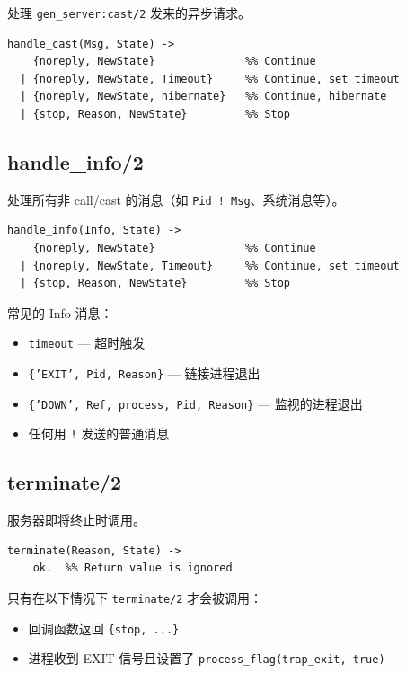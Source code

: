 \documentclass[a4paper,11pt]{article}
\begin{document}
处理 \texttt{gen\_server:cast/2} 发来的异步请求。

\begin{lstlisting}[style=erlangstyle, caption={handle\_cast/2 返回值}]
handle_cast(Msg, State) ->
    {noreply, NewState}              %% Continue
  | {noreply, NewState, Timeout}     %% Continue, set timeout
  | {noreply, NewState, hibernate}   %% Continue, hibernate
  | {stop, Reason, NewState}         %% Stop
\end{lstlisting}

\subsection{handle\_info/2}

处理所有非 call/cast 的消息（如 \texttt{Pid ! Msg}、系统消息等）。

\begin{lstlisting}[style=erlangstyle, caption={handle\_info/2 返回值}]
handle_info(Info, State) ->
    {noreply, NewState}              %% Continue
  | {noreply, NewState, Timeout}     %% Continue, set timeout
  | {stop, Reason, NewState}         %% Stop
\end{lstlisting}

常见的 Info 消息：
\begin{itemize}[leftmargin=2em]
    \item \texttt{timeout} --- 超时触发
    \item \texttt{\{'EXIT', Pid, Reason\}} --- 链接进程退出
    \item \texttt{\{'DOWN', Ref, process, Pid, Reason\}} --- 监视的进程退出
    \item 任何用 \texttt{!} 发送的普通消息
\end{itemize}

\subsection{terminate/2}

服务器即将终止时调用。

\begin{lstlisting}[style=erlangstyle]
terminate(Reason, State) ->
    ok.  %% Return value is ignored
\end{lstlisting}

\begin{warnbox}[注意]
只有在以下情况下 \texttt{terminate/2} 才会被调用：
\begin{itemize}
    \item 回调函数返回 \texttt{\{stop, ...\}}
    \item 进程收到 EXIT 信号且设置了 \texttt{process\_flag(trap\_exit, true)}
\end{itemize}
\end{warnbox}
\end{document}
